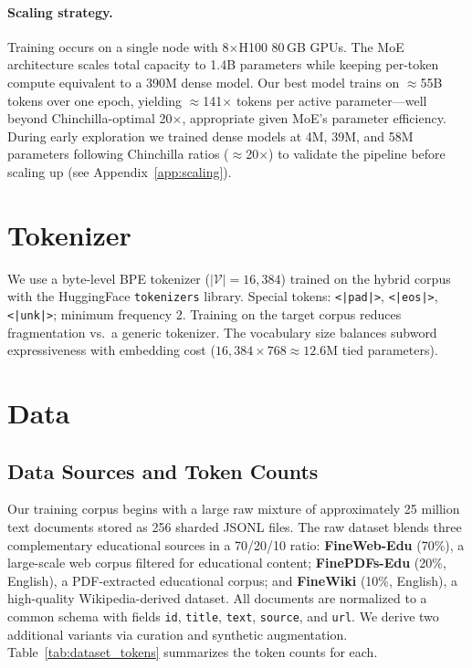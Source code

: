 \documentclass[10pt]{article}
\begin{document}
\paragraph{Scaling strategy.}
Training occurs on a single node with 8$\times$H100 80\,GB GPUs.
The MoE architecture scales total capacity to 1.4B parameters while keeping per-token compute equivalent to a 390M dense model.
Our best model trains on ${\approx}$55B tokens over one epoch, yielding ${\approx}$141$\times$ tokens per active parameter---well beyond Chinchilla-optimal 20$\times$, appropriate given MoE's parameter efficiency.
During early exploration we trained dense models at 4M, 39M, and 58M parameters following Chinchilla ratios (${\approx}$20$\times$) to validate the pipeline before scaling up (see Appendix~\ref{app:scaling}).

\section{Tokenizer}

We use a byte-level BPE tokenizer ($|\mathcal{V}|{=}16{,}384$) trained on the hybrid corpus with the HuggingFace \texttt{tokenizers} library.
Special tokens: \texttt{<|pad|>}, \texttt{<|eos|>}, \texttt{<|unk|>}; minimum frequency 2.
Training on the target corpus reduces fragmentation vs.\ a generic tokenizer.
The vocabulary size balances subword expressiveness with embedding cost ($16{,}384 \times 768 \approx 12.6$M tied parameters).

\section{Data}

\subsection{Data Sources and Token Counts}

Our training corpus begins with a large raw mixture of approximately
25 million text documents stored as 256 sharded JSONL files.
The raw dataset blends three complementary educational sources in a 70/20/10 ratio:
\textbf{FineWeb-Edu} (70\%), a large-scale web corpus filtered for educational content;
\textbf{FinePDFs-Edu} (20\%, English), a PDF-extracted educational corpus; and
\textbf{FineWiki} (10\%, English), a high-quality Wikipedia-derived dataset.
All documents are normalized to a common schema with fields \texttt{id}, \texttt{title}, \texttt{text}, \texttt{source}, and \texttt{url}.
We derive two additional variants via curation and synthetic augmentation.
Table~\ref{tab:dataset_tokens} summarizes the token counts for each.
\end{document}
